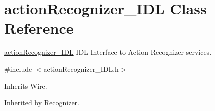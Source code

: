 \section{action\+Recognizer\+\_\+\+I\+DL Class Reference}
\label{classactionRecognizer__IDL}


\mbox{\hyperlink{classactionRecognizer__IDL}{action\+Recognizer\+\_\+\+I\+DL}} I\+DL Interface to Action Recognizer services.  




{\ttfamily \#include $<$action\+Recognizer\+\_\+\+I\+D\+L.\+h$>$}



Inherits Wire.



Inherited by Recognizer.

